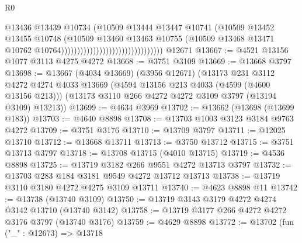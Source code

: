 \begin{lexlean}{R0}
\begin{coremodule}
                                                            @13436
                                                            @13439
                                                            @10734
                                                            (@10509
                                                              @13444
                                                              @13447
                                                              @10741
                                                              (@10509
                                                                @13452
                                                                @13455
                                                                @10748
                                                                (@10509
                                                                  @13460
                                                                  @13463
                                                                  @10755
                                                                  (@10509
                                                                    @13468
                                                                    @13471
                                                                    @10762
                                                                    @10764))))))))))))))))))))))))))))))))
    @12671
@13667 := @4521 @13156 @1077 @3113 @4275 @4272
@13668 := @3751 @3109
@13669 := @13668 @3797
@13698 := @13667
    (@4034 @13669)
    (@3956 @12671)
    (@13173
      @231
      @3112
      @4272
      @4274
      @4033
      @13669
      (@4594 @13156 @213 @4033 (@4599 (@4600 @13156 @213)))
      (@13173 @3110 @266 @4272 @4272 @3109 @3797 (@13194 @3109) @13213))
@13699 := @4634 @3969
@13702 := @13662 (@13698 (@13699 @183))
@13703 := @4640 @8898
@13708 := @13703 @1003 @3123 @3184 @9763 @4272
@13709 := @3751 @3176
@13710 := @13709 @3797
@13711 := @12025 @13710
@13712 := @13668 @13711
@13713 := @3750 @13712
@13715 := @3751 @13713 @3797
@13718 := @13708 @13715 (@4010 @13715)
@13719 := @4536 @8898
@13725 := @13719 @3182 @266 @9551 @4272 @13713 @3797
@13732 := @13703 @283 @184 @3181 @9549 @4272 @13712 @13713
@13738 := @13719 @3110 @3180 @4272 @4275 @3109 @13711
@13740 := @4623 @8898 @11
@13742 := @13738 (@13740 @3109)
@13750 := @13719 @3143 @3179 @4272 @4274 @3142 @13710 (@13740 @3142)
@13758 := @13719 @3177 @266 @4272 @4272 @3176 @3797 (@13740 @3176)
@13759 := @4629 @8898
@13772 := @13702
    (fun ("_" : @12673) =>
    @13718

\end{coremodule}
\end{lexlean}
